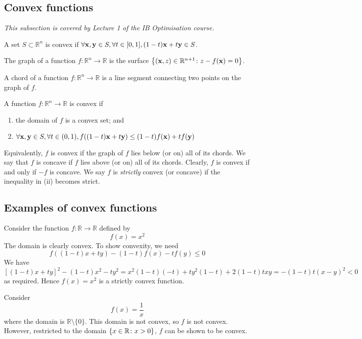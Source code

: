 \subsection{Convex functions}
\textit{This subsection is covered by Lecture 1 of the IB Optimisation course.}
\begin{definition}
	A set \( S \subset \mathbb R^n \) is convex if \( \forall \vb x, \vb y \in S, \forall t \in [0,1], (1-t)\vb x + t \vb y \in S \).
\end{definition}
\begin{definition}
	The graph of a function \( f \colon \mathbb R^n \to \mathbb R \) is the surface \( \qty{ (\vb x, z)\in \mathbb R^{n+1} \colon z - f(\vb x) = 0} \).
\end{definition}
\begin{definition}
	A chord of a function \( f \colon \mathbb R^n \to \mathbb R \) is a line segment connecting two points on the graph of \( f \).
\end{definition}
\begin{definition}
	A function \( f \colon \mathbb R^n \to \mathbb R \) is convex if
	\begin{enumerate}
		\item the domain of \( f \) is a convex set; and
		\item \( \forall \vb x, \vb y \in S, \forall t \in (0,1), f((1-t)\vb x + t\vb y) \leq (1-t)f(\vb x) + tf(\vb y) \)
	\end{enumerate}
	Equivalently, \( f \) is convex if the graph of \( f \) lies below (or on) all of its chords.
	We say that \( f \) is concave if \( f \) lies above (or on) all of its chords.
	Clearly, \( f \) is convex if and only if \( -f \) is concave.
	We say \( f \) is \textit{strictly} convex (or concave) if the inequality in (ii) becomes strict.
\end{definition}

\subsection{Examples of convex functions}
\begin{example}
	Consider the function \( f \colon \mathbb R \to \mathbb R \) defined by
	\[
		f(x) = x^2
	\]
	The domain is clearly convex.
	To show convexity, we need
	\[
		f((1-t)x+ty) - (1-t)f(x) - tf(y) \leq 0
	\]
	We have
	\[
		[(1-t)x+ty]^2 - (1-t)x^2 - ty^2 = x^2(1-t)(-t) + ty^2(1-t) + 2(1-t)txy = -(1-t)t(x-y)^2 < 0
	\]
	as required.
	Hence \( f(x) = x^2 \) is a strictly convex function.
\end{example}
\begin{example}
	Consider
	\[
		f(x) = \frac{1}{x}
	\]
	where the domain is \( \mathbb R \setminus \{ 0 \} \).
	This domain is not convex, so \( f \) is not convex.
	However, restricted to the domain \( \qty{ x \in \mathbb R \colon x > 0 } \), \( f \) can be shown to be convex.
\end{example}

